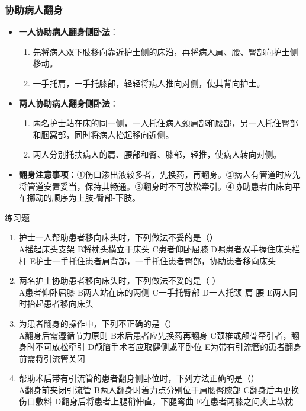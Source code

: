 \documentclass[11pt, a4paper]{ctexart}
\begin{document}
\subsubsection{协助病人翻身}
\begin{itemize}
	\item \textbf{一人协助病人翻身侧卧法}：
	      \begin{enumerate}
		      \item 先将病人双下肢移向靠近护士侧的床沿，再将病人肩、腰、臀部向护士侧移动。
		      \item 一手托肩，一手托膝部，轻轻将病人推向对侧，使其背向护士。
	      \end{enumerate}
	\item \textbf{两人协助病人翻身侧卧法}：
	      \begin{enumerate}
		      \item 两名护士站在床的同一侧，一人托住病人颈肩部和腰部，另一人托住臀部和腘窝部，同时将病人抬起移向近侧。
		      \item 两人分别托扶病人的肩、腰部和臀、膝部，轻推，使病人转向对侧。
	      \end{enumerate}
	\item \textbf{翻身注意事项}：①伤口渗出液较多者，先换药，再翻身。②病人有管道时应先将管道安置妥当，保持其畅通。③翻身时不可放松牵引。④协助患者由床向平车挪动的顺序为上肢-臀部-下肢。
\end{itemize}

\begin{examplebox}{练习题}
	\begin{enumerate}
		\item 护士一人帮助患者移向床头时，下列做法不妥的是（\qquad）\\
		      A摇起床头支架 \quad B将枕头横立于床头 \quad C患者仰卧屈膝 \quad D嘱患者双手握住床头栏杆 \quad E护士一手托住患者肩背部，一手托住患者臀部，协助患者移向床头
		\item 两名护士协助患者移向床头时，下列做法不妥的是（   ）\\
		      A患者仰卧屈膝 \quad B两人站在床的两侧 \quad C一手托臀部 \quad D一人托颈 肩 腰 \quad E两人同时抬起患者移向床头
		\item 为患者翻身的操作中，下列不正确的是（\qquad）\\
		      A翻身后需遵循节力原则 \quad B术后患者应先换药再翻身 \quad C颈椎或颅骨牵引者，翻身时不可放松牵引 \quad D颅脑手术者应取健侧或平卧位 \quad E为带有引流管的患者翻身前需将引流管关闭
		\item 帮助术后带有引流管的患者翻身侧卧位时，下列方法正确的是（\qquad）\\
		      A翻身前夹闭引流管 \quad B两人翻身时着力点分别位于肩腰臀膝部 \quad C翻身后再更换伤口敷料 \quad D翻身后将患者上腿稍伸直，下腿弯曲 \quad E在患者两膝之间夹上软枕
	\end{enumerate}
\end{examplebox}
\end{document}
